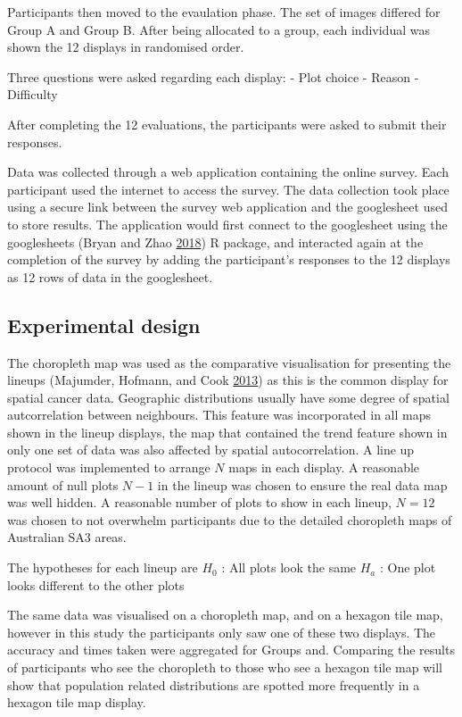 \documentclass[conference,final,]{IEEEtran}
\begin{document}
Participants then moved to the evaulation phase. The set of images
differed for Group A and Group B. After being allocated to a group, each
individual was shown the 12 displays in randomised order.

Three questions were asked regarding each display: - Plot choice -
Reason - Difficulty

After completing the 12 evaluations, the participants were asked to
submit their responses.

Data was collected through a web application containing the online
survey. Each participant used the internet to access the survey. The
data collection took place using a secure link between the survey web
application and the googlesheet used to store results. The application
would first connect to the googlesheet using the googlesheets (Bryan and
Zhao \protect\hyperlink{ref-sheets}{2018}) R package, and interacted
again at the completion of the survey by adding the participant's
responses to the 12 displays as 12 rows of data in the googlesheet.

\hypertarget{experimental-design}{%
\subsection{Experimental design}\label{experimental-design}}

The choropleth map was used as the comparative visualisation for
presenting the lineups (Majumder, Hofmann, and Cook
\protect\hyperlink{ref-VVSIALM}{2013}) as this is the common display for
spatial cancer data. Geographic distributions usually have some degree
of spatial autcorrelation between neighbours. This feature was
incorporated in all maps shown in the lineup displays, the map that
contained the trend feature shown in only one set of data was also
affected by spatial autocorrelation. A line up protocol was implemented
to arrange \(N\) maps in each display. A reasonable amount of null plots
\(N-1\) in the lineup was chosen to ensure the real data map was well
hidden. A reasonable number of plots to show in each lineup, \(N = 12\)
was chosen to not overwhelm participants due to the detailed choropleth
maps of Australian SA3 areas.

The hypotheses for each lineup are \(H_0\) : All plots look the same
\(H_a\) : One plot looks different to the other plots

The same data was visualised on a choropleth map, and on a hexagon tile
map, however in this study the participants only saw one of these two
displays. The accuracy and times taken were aggregated for Groups and.
Comparing the results of participants who see the choropleth to those
who see a hexagon tile map will show that population related
distributions are spotted more frequently in a hexagon tile map display.
\end{document}
